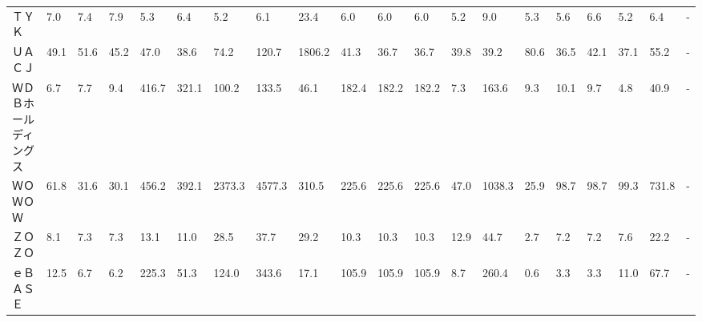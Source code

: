 \begin{tabular}{llllllllllllllllllll}
ＴＹＫ             &    7.0 &    7.4 &       7.9 &       5.3 &        6.4 &     5.2 &     6.1 &     23.4 &     6.0 &     6.0 &    6.0 &    5.2 &     9.0 &     5.3 &     5.6 &    6.6 &    5.2 &     6.4 &      - \\
ＵＡＣＪ            &   49.1 &   51.6 &      45.2 &      47.0 &       38.6 &    74.2 &   120.7 &   1806.2 &    41.3 &    36.7 &   36.7 &   39.8 &    39.2 &    80.6 &    36.5 &   42.1 &   37.1 &    55.2 &      - \\
ＷＤＢホールディングス     &    6.7 &    7.7 &       9.4 &     416.7 &      321.1 &   100.2 &   133.5 &     46.1 &   182.4 &   182.2 &  182.2 &    7.3 &   163.6 &     9.3 &    10.1 &    9.7 &    4.8 &    40.9 &      - \\
ＷＯＷＯＷ           &   61.8 &   31.6 &      30.1 &     456.2 &      392.1 &  2373.3 &  4577.3 &    310.5 &   225.6 &   225.6 &  225.6 &   47.0 &  1038.3 &    25.9 &    98.7 &   98.7 &   99.3 &   731.8 &      - \\
ＺＯＺＯ            &    8.1 &    7.3 &       7.3 &      13.1 &       11.0 &    28.5 &    37.7 &     29.2 &    10.3 &    10.3 &   10.3 &   12.9 &    44.7 &     2.7 &     7.2 &    7.2 &    7.6 &    22.2 &      - \\
ｅＢＡＳＥ           &   12.5 &    6.7 &       6.2 &     225.3 &       51.3 &   124.0 &   343.6 &     17.1 &   105.9 &   105.9 &  105.9 &    8.7 &   260.4 &     0.6 &     3.3 &    3.3 &   11.0 &    67.7 &      - \\
\bottomrule
\end{tabular}
